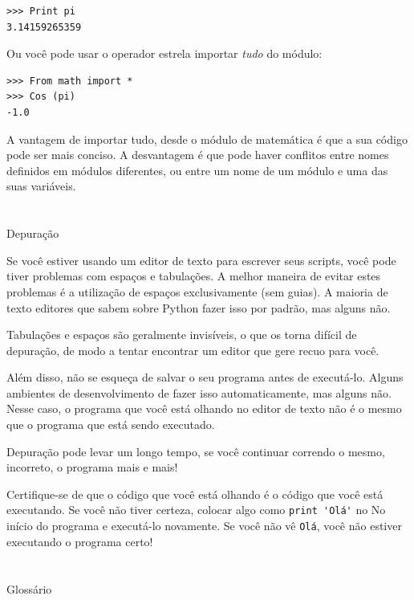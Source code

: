 \documentclass[10pt]{book}
\begin{document}
\begin{exercise}
\begin{verbatim}
>>> Print pi
3.14159265359
\end{verbatim}
%
Ou você pode usar o operador estrela importar {\it tudo} do
módulo:

\begin{verbatim}
>>> From math import *
>>> Cos (pi)
-1.0
\end{verbatim}

A vantagem de importar tudo, desde o módulo de matemática é que a sua
código pode ser mais conciso. A desvantagem é que pode haver
conflitos entre nomes definidos em módulos diferentes, ou entre
um nome de um módulo e uma das suas variáveis.


\section{} Depuração
\label{editor}

Se você estiver usando um editor de texto para escrever seus scripts, você pode
tiver problemas com espaços e tabulações. A melhor maneira de evitar
estes problemas é a utilização de espaços exclusivamente (sem guias). A maioria de texto
editores que sabem sobre Python fazer isso por padrão, mas alguns
não.

Tabulações e espaços são geralmente invisíveis, o que os torna
difícil de depuração, de modo a tentar encontrar um editor que gere recuo
para você.

Além disso, não se esqueça de salvar o seu programa antes de executá-lo. Alguns
ambientes de desenvolvimento de fazer isso automaticamente, mas alguns não.
Nesse caso, o programa que você está olhando no editor de texto
não é o mesmo que o programa que está sendo executado.

Depuração pode levar um longo tempo, se você continuar correndo o mesmo,
incorreto, o programa mais e mais!

Certifique-se de que o código que você está olhando é o código que você está executando.
Se você não tiver certeza, colocar algo como \verb "print 'Olá'" no
No início do programa e executá-lo novamente. Se você não vê
\Verb "Olá", você não estiver executando o programa certo!




\section{} Glossário

\begin{description}


\end{description}
\end{exercise}
\end{document}
